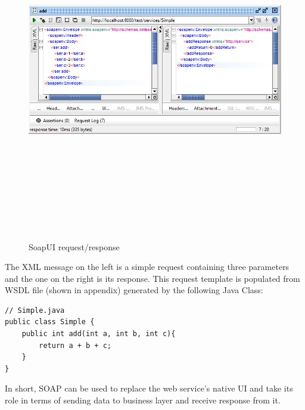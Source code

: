 \documentclass[12pt]{article}
\begin{document}
\begin{figure}[ht!]
\centering
\includegraphics[width=15cm,height=15cm,keepaspectratio]{img/soapui.jpg}
\caption{SoapUI request/response}
\label{overflow}
\end{figure}

The XML message on the left is a simple request containing three parameters and the one on the right is its response. This request template is populated from WSDL file (shown in appendix) generated by the following Java Class:\\

\begin{lstlisting}
// Simple.java
public class Simple {
	public int add(int a, int b, int c){
		return a + b + c;
	}
}

\end{lstlisting}

In short, SOAP can be used to replace the web service's native UI and take its role in terms of sending data to business layer and receive response from it.
\end{document}
